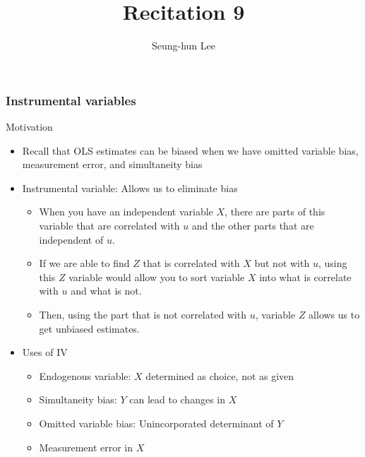 \documentclass[compress]{beamer}
\title[Recitation 9]{Recitation 9} %
\author[Seung-hun Lee]{Seung-hun Lee}
\institute[Columbia University]{Columbia University}
\date[]{}
\begin{document}
\begin{frame}
\titlepage
\end{frame}



\begin{frame}
\frametitle{Instrumental variables}
Motivation
\begin{itemize}
\item Recall that OLS estimates can be biased when we have omitted variable bias, measurement error, and simultaneity bias
\item Instrumental variable: Allows us to eliminate bias
\begin{itemize}
\item When you have an independent variable $X$, there are parts of this variable that are correlated with $u$ and the other parts that are independent of $u$.
\item If we are able to find $Z$ that is correlated with $X$ but not with $u$, using this $Z$ variable would allow you to sort variable $X$ into what is correlate with $u$ and what is not. 
\item Then, using the part that is not correlated with $u$, variable $Z$ allows us to get unbiased estimates.
\end{itemize}
\item Uses of IV
\begin{itemize}
\item Endogenous variable: $X$ determined as choice, not as given
\item Simultaneity bias: $Y$ can lead to changes in $X$
\item Omitted variable bias: Unincorporated determinant of $Y$
\item Measurement error in $X$ 
\end{itemize}
\end{itemize}
\end{frame}
\end{document}

